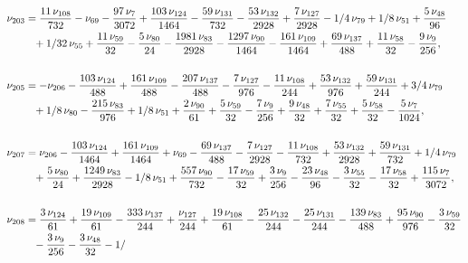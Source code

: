 \documentclass[a4paper,12pt, DIV=14, BCOR=5mm, twoside, headsepline]{scrbook}
\begin{document}
\begin{align}\label{AreaSol19}
\begin{aligned}
\nu_{{203}}&={\frac {11\,\nu_{{108}}}{732
}}-\nu_{{69}}-{\frac {97\,\nu_{{7}}}{3072}}+{\frac {103\,\nu_{{124}}}{
1464}}-{\frac {59\,\nu_{{131}}}{732}}-{\frac {53\,\nu_{{132}}}{2928}}+
{\frac {7\,\nu_{{127}}}{2928}}-1/4\,\nu_{{79}}+1/8\,\nu_{{51}}+{\frac 
{5\,\nu_{{48}}}{96}}\\
 &\hphantom{=}+1/32\,\nu_{{55}}+{\frac {11\,\nu_{{59}}}{32}}-{
\frac {5\,\nu_{{80}}}{24}}-{\frac {1981\,\nu_{{83}}}{2928}}-{\frac {
1297\,\nu_{{90}}}{1464}}-{\frac {161\,\nu_{{109}}}{1464}}+{\frac {69\,
\nu_{{137}}}{488}}+{\frac {11\,\nu_{{58}}}{32}}-{\frac {9\,\nu_{{9}}}{
256}}, \\
\\
\nu_{{205}}&=-\nu_{{206}}-{\frac {103\,\nu_{{124}}}{488}}+{\frac 
{161\,\nu_{{109}}}{488}}-{\frac {207\,\nu_{{137}}}{488}}-{\frac {7\,
\nu_{{127}}}{976}}-{\frac {11\,\nu_{{108}}}{244}}+{\frac {53\,\nu_{{
132}}}{976}}+{\frac {59\,\nu_{{131}}}{244}}+3/4\,\nu_{{79}}\\
 &\hphantom{=}+1/8\,\nu_{
{80}}-{\frac {215\,\nu_{{83}}}{976}}+1/8\,\nu_{{51}}+{\frac {2\,\nu_{{
90}}}{61}}+{\frac {5\,\nu_{{59}}}{32}}-{\frac {7\,\nu_{{9}}}{256}}+{
\frac {9\,\nu_{{48}}}{32}}+{\frac {7\,\nu_{{55}}}{32}}+{\frac {5\,\nu_
{{58}}}{32}}-{\frac {5\,\nu_{{7}}}{1024}}, \\
\\
\nu_{{207}}&=\nu_{{206}}-{
\frac {103\,\nu_{{124}}}{1464}}+{\frac {161\,\nu_{{109}}}{1464}}+\nu_{
{69}}-{\frac {69\,\nu_{{137}}}{488}}-{\frac {7\,\nu_{{127}}}{2928}}-{
\frac {11\,\nu_{{108}}}{732}}+{\frac {53\,\nu_{{132}}}{2928}}+{\frac {
59\,\nu_{{131}}}{732}}+1/4\,\nu_{{79}}\\
 &\hphantom{=}+{\frac {5\,\nu_{{80}}}{24}}+{
\frac {1249\,\nu_{{83}}}{2928}}-1/8\,\nu_{{51}}+{\frac {557\,\nu_{{90}
}}{732}}-{\frac {17\,\nu_{{59}}}{32}}+{\frac {3\,\nu_{{9}}}{256}}-{
\frac {23\,\nu_{{48}}}{96}}-{\frac {3\,\nu_{{55}}}{32}}-{\frac {17\,
\nu_{{58}}}{32}}+{\frac {115\,\nu_{{7}}}{3072}}, \\
\\
\nu_{{208}}&={\frac {3
\,\nu_{{124}}}{61}}+{\frac {19\,\nu_{{109}}}{61}}-{\frac {333\,\nu_{{
137}}}{244}}+{\frac {\nu_{{127}}}{244}}+{\frac {19\,\nu_{{108}}}{61}}-
{\frac {25\,\nu_{{132}}}{244}}-{\frac {25\,\nu_{{131}}}{244}}-{\frac {
139\,\nu_{{83}}}{488}}+{\frac {95\,\nu_{{90}}}{976}}-{\frac {3\,\nu_{{
59}}}{32}}\\
 &\hphantom{=}-{\frac {3\,\nu_{{9}}}{256}}-{\frac {3\,\nu_{{48}}}{32}}-1/

\end{aligned}
\end{align}
\end{document}
